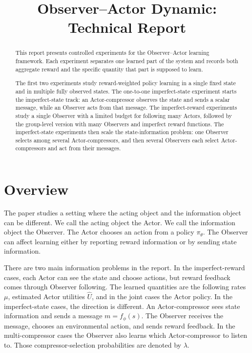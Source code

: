\documentclass[11pt]{article}
\title{\textbf{Observer--Actor Dynamic: Technical Report}}
\author{}
\date{}
\begin{document}
\maketitle

\begin{abstract}
This report presents controlled experiments for the Observer--Actor learning
framework. Each experiment separates one learned part of the system and records
both aggregate reward and the specific quantity that part is supposed to learn.

The first two experiments study reward-weighted policy learning in a single fixed
state and in multiple fully observed states. The one-to-one imperfect-state
experiment starts the imperfect-state track:
an Actor-compressor observes the state and sends a scalar message, while an
Observer acts from that message. The imperfect-reward experiments study a
single Observer with a limited budget for following many Actors, followed by
the group-level version with many Observers and imperfect reward functions. The
imperfect-state experiments then scale the state-information problem: one
Observer selects among several Actor-compressors, and then several Observers
each select Actor-compressors and act from their messages.
\end{abstract}

\tableofcontents

\section{Overview}

The paper studies a setting where the acting object and the information object
can be different. We call the acting object the Actor. We call the information
object the Observer. The Actor chooses an action from a policy
\(\pi_\theta\). The Observer can affect learning either by reporting reward
information or by sending state information.

There are two main information problems in the report. In the imperfect-reward
cases, each Actor can see the state and choose actions, but reward feedback
comes through Observer following. The learned quantities are the following
rates \(\mu\), estimated Actor utilities \(\hat U\), and in the joint cases
the Actor policy. In the imperfect-state cases, the direction is different.
An Actor-compressor sees state information and sends a message
\(m=f_\phi(s)\). The Observer receives the message, chooses an environmental
action, and sends reward feedback. In the multi-compressor cases the Observer
also learns which Actor-compressor to listen to. Those compressor-selection
probabilities are denoted by \(\lambda\).
\end{document}
